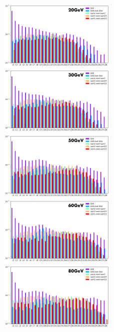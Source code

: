 \begin{figure}[p]
    \begin{center}  
    \includegraphics[width=0.5\textwidth]{Fig/fig_HGCAL/Feature_importance_showershape_dynamicwindow_v2_20GeV}~
    \includegraphics[width=0.5\textwidth]{Fig/fig_HGCAL/Feature_importance_showershape_dynamicwindow_v2_30GeV}\\
    \includegraphics[width=0.5\textwidth]{Fig/fig_HGCAL/Feature_importance_showershape_dynamicwindow_v2_50GeV}~
    \includegraphics[width=0.5\textwidth]{Fig/fig_HGCAL/Feature_importance_showershape_dynamicwindow_v2_60GeV}\\
    \includegraphics[width=0.5\textwidth]{Fig/fig_HGCAL/Feature_importance_showershape_dynamicwindow_v2_80GeV}~

\end{center}
\end{figure}
